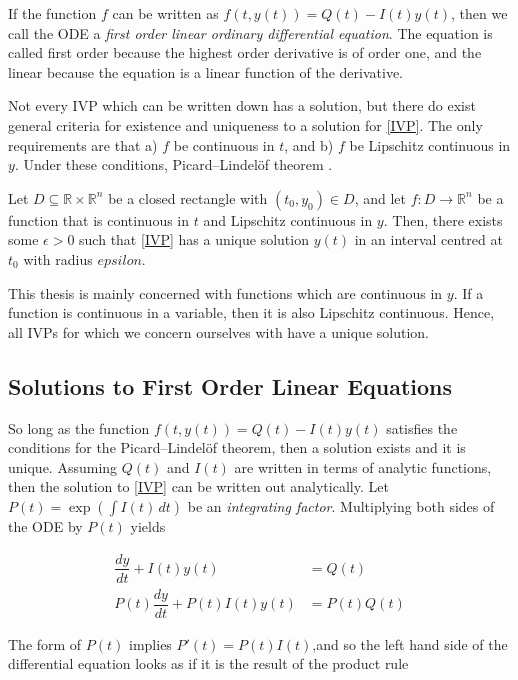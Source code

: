 \noindent If the function $f$ can be written as $f(t, y(t)) = Q(t) - I(t) y(t)$, then we call the ODE a \textit{first order linear ordinary differential equation}.  The equation is called first order because the highest order derivative is of order one, and the linear because the equation is a linear function of the derivative. 

Not every IVP which can be written down has a solution, but there do exist general criteria for existence and uniqueness to a solution for \cref{IVP}.  The only requirements are that a) $f$ be continuous in $t$, and b) $f$ be Lipschitz continuous in $y$.  Under these conditions, Picard–Lindelöf theorem \cite{morris1963ordinary}.

\begin{theorem}
	Let $D \subseteq \mathbb{R} \times \mathbb{R}^n$ be a closed rectangle with $(t_0, y_0) \in D$, and let $f : D \to \mathbb{R}^n$ be a function that is continuous in $t$ and Lipschitz continuous in $y$.  Then, there exists some $\epsilon>0$ such that \cref{IVP} has a unique solution $y(t)$ in an interval centred at $t_0$ with radius $epsilon$.
\end{theorem}

\noindent This thesis is mainly concerned with functions which are continuous in $y$.  If a function is continuous in a variable, then it is also Lipschitz continuous.  Hence, all IVPs for which we concern ourselves with have a unique solution.


\subsection{Solutions to First Order Linear Equations}

So long as the function $f(t, y(t)) = Q(t) - I(t) y(t)$ satisfies the conditions for the Picard–Lindelöf theorem, then a solution exists and it is unique.  Assuming $Q(t)$ and $I(t)$ are written in terms of analytic functions, then the solution to \cref{IVP} can be written out analytically.  Let $P(t) = \exp(\int I(t) \, dt)$ be an \textit{integrating factor}.  Multiplying both sides of the ODE by $P(t)$ yields

\begin{align}
	\dfrac{dy}{dt} + I(t)y(t) &= Q(t) \\
	P(t)\dfrac{dy}{dt} + P(t)I(t)y(t) &= P(t)Q(t) 
\end{align}

\noindent  The form of $P(t)$ implies $P'(t) = P(t)I(t)$,and so the left hand side of the differential equation looks as if it is the result of the product rule

